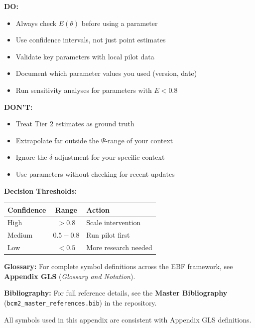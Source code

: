 \documentclass[11pt,a4paper]{article}
\theoremstyle{definition}
\begin{document}
\begin{tcolorbox}[colback=yellow!5!white, colframe=yellow!75!black, 
    title=\textbf{For Practitioners: Using BBB Estimates}]

\textbf{DO:}
\begin{itemize}[nosep]
    \item Always check $E(\theta)$ before using a parameter
    \item Use confidence intervals, not just point estimates
    \item Validate key parameters with local pilot data
    \item Document which parameter values you used (version, date)
    \item Run sensitivity analyses for parameters with $E < 0.8$
\end{itemize}

\textbf{DON'T:}
\begin{itemize}[nosep]
    \item Treat Tier 2 estimates as ground truth
    \item Extrapolate far outside the $\Psi$-range of your context
    \item Ignore the $\delta$-adjustment for your specific context
    \item Use parameters without checking for recent updates
\end{itemize}

\textbf{Decision Thresholds:}
\begin{center}
\begin{tabular}{@{}lcl@{}}
\toprule
\textbf{Confidence} & \textbf{Range} & \textbf{Action} \\
\midrule
High & $> 0.8$ & Scale intervention \\
Medium & $0.5 - 0.8$ & Run pilot first \\
Low & $< 0.5$ & More research needed \\
\bottomrule
\end{tabular}
\end{center}

\end{tcolorbox}





\begin{tcolorbox}[colback=blue!5!white, colframe=blue!75!black, 
    title=\textbf{Central References}]

\textbf{Glossary:} For complete symbol definitions across the EBF framework, 
see \textbf{Appendix GLS} (\textit{Glossary and Notation}).

\textbf{Bibliography:} For full reference details, see the 
\textbf{Master Bibliography} (\texttt{bcm2\_master\_references.bib}) 
in the repository.

All symbols used in this appendix are consistent with Appendix GLS definitions.

\end{tcolorbox}
\end{document}
